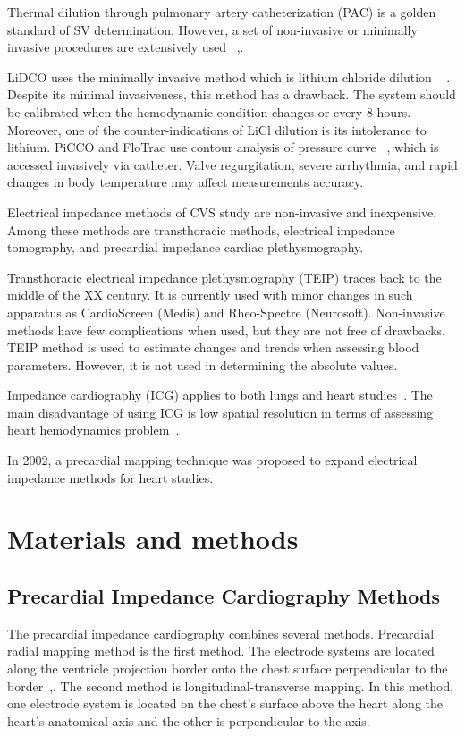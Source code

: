 \documentclass[conference]{IEEEtran}
\begin{document}
Thermal dilution through pulmonary artery catheterization (PAC) is a golden standard of SV determination.
However, a set of non-invasive or minimally invasive procedures are extensively used ~\cite{Kobe2019},\cite{Mehta2014}.

LiDCO uses the minimally invasive method which is lithium chloride dilution ~\cite{Linton1993} .
Despite its minimal invasiveness, this method has a drawback.
The system should be calibrated when the hemodynamic condition changes or every 8 hours.
Moreover, one of the counter-indications of LiCl dilution is its intolerance to lithium.
PiCCO and FloTrac use contour analysis of pressure curve ~\cite{Horster2012}, which is accessed invasively via catheter.
Valve regurgitation, severe arrhythmia, and rapid changes in body temperature may affect measurements accuracy.

Electrical impedance methods of CVS study are non-invasive and inexpensive.
Among these methods are transthoracic methods, electrical impedance tomography, and precardial impedance cardiac plethysmography.

Transthoracic electrical impedance plethysmography (TEIP) traces back to the middle of the XX century.
It is currently used with minor changes in such apparatus as CardioScreen (Medis) and Rheo-Spectre (Neurosoft).
Non-invasive methods have few complications when used, but they are not free of drawbacks.
TEIP method is used to estimate changes and trends when assessing blood parameters.
However, it is not used in determining the absolute values.

Impedance cardiography (ICG) applies to both lungs and heart studies~\cite{Brown2003, Wu2018}.
The main disadvantage of using ICG is low spatial resolution in terms of assessing heart hemodynamics problem~\cite{Kircher2019, Rymarczyk2019}.

In 2002, a precardial mapping technique was proposed to expand electrical impedance methods for heart studies.

\section{Materials and methods}

\subsection{Precardial Impedance Cardiography Methods}

The precardial impedance cardiography combines several methods.
Precardial radial mapping method is the first method.
The electrode systems are located along the ventricle projection border onto the chest surface perpendicular to the border~\cite{Timokhin2014},\cite{Tikhomirov2019}.
The second method is longitudinal-transverse mapping.
In this method, one electrode system is located on the chest’s surface above the heart along the heart’s anatomical axis and the other is perpendicular to the axis.
\end{document}
